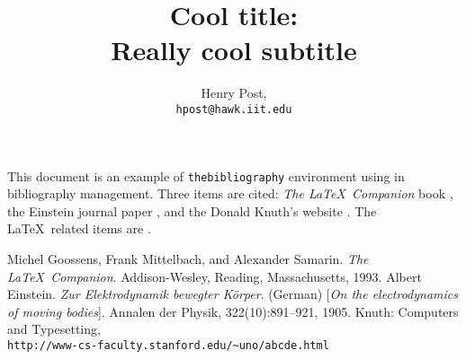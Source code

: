 \documentclass[a4paper,12pt]{article}
\title{Cool title: \\ Really cool subtitle}
\author{Henry Post, \\\texttt{hpost@hawk.iit.edu}}
\begin{document}
\maketitle

\newpage

This document is an example of \texttt{thebibliography} environment using in bibliography management. Three items are cited: \textit{The \LaTeX\ Companion} book \cite{latexcompanion}, the Einstein journal paper \cite{einstein}, and the Donald Knuth's website \cite{knuthwebsite}. The \LaTeX\ related items are \cite{latexcompanion,knuthwebsite}. 

\lipsum[2-4]


\medskip

\begin{thebibliography}{9}
 Michel Goossens, Frank Mittelbach, and Alexander Samarin. \textit{The \LaTeX\ Companion}. Addison-Wesley, Reading, Massachusetts, 1993.
 Albert Einstein. \textit{Zur Elektrodynamik bewegter K{\"o}rper}. (German) [\textit{On the electrodynamics of moving bodies}]. Annalen der Physik, 322(10):891–921, 1905.
 Knuth: Computers and Typesetting,\\\texttt{http://www-cs-faculty.stanford.edu/\~{}uno/abcde.html}
\end{thebibliography}

\newpage

\end{document}
